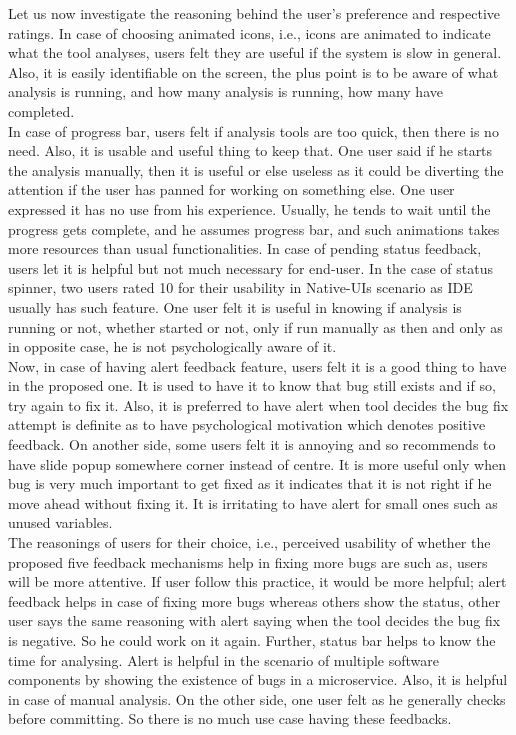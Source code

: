 Let us now investigate the reasoning behind the user’s preference and respective ratings. In case of choosing animated icons, i.e., icons are animated to indicate what the tool analyses, users felt they are useful if the system is slow in general. Also, it is easily identifiable on the screen, the plus point is to be aware of what analysis is running, and how many analysis is running, how many have completed. \\

In case of progress bar, users felt if analysis tools are too quick, then there is no need. Also, it is usable and useful thing to keep that. One user said if he starts the analysis manually, then it is useful or else useless as it could be diverting the attention if the user has panned for working on something else. One user expressed it has no use from his experience. Usually, he tends to wait until the progress gets complete, and he assumes progress bar, and such animations takes more resources than usual functionalities. In case of pending status feedback, users let it is helpful but not much necessary for end-user. In the case of status spinner, two users rated 10 for their usability in Native-UIs scenario as IDE usually has such feature. One user felt it is useful in knowing if analysis is running or not, whether started or not, only if run manually as then and only as in opposite case, he is not psychologically aware of it. \\

Now, in case of having alert feedback feature, users felt it is a good thing to have in the proposed one. It is used to have it to know that bug still exists and if so, try again to fix it. Also, it is preferred to have alert when tool decides the bug fix attempt is definite as to have psychological motivation which denotes positive feedback. On another side, some users felt it is annoying and so recommends to have slide popup somewhere corner instead of centre. It is more useful only when bug is very much important to get fixed as it indicates that it is not right if he move ahead without fixing it. It is irritating to have alert for small ones such as unused variables. \\
 
The reasonings of users for their choice, i.e., perceived usability of whether the proposed five feedback mechanisms help in fixing more bugs are such as, users will be more attentive. If user follow this practice, it would be more helpful; alert feedback helps in case of fixing more bugs whereas others show the status, other user says the same reasoning with alert saying when the tool decides the bug fix is negative. So he could work on it again. Further, status bar helps to know the time for analysing. Alert is helpful in the scenario of multiple software components by showing the existence of bugs in a microservice. Also, it is helpful in case of manual analysis. On the other side, one user felt as he generally checks before committing. So there is no much use case having these feedbacks.  \\

